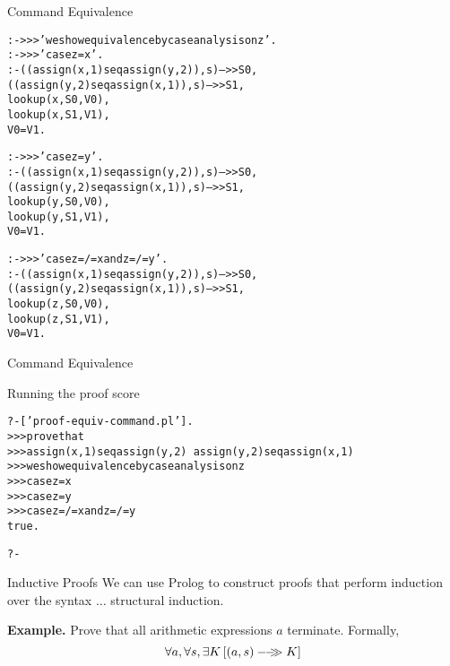 \documentclass{beamer}
\begin{document}
\begin{frame}[fragile]{Command Equivalence}
\scriptsize
\begin{alltt}
:- >>> 'we show equivalence by case analysis on z' .
:- >>> 'case z = x'.
:- ((assign(x,1) seq assign(y,2)),s)-->>S0,
   ((assign(y,2) seq assign(x,1)),s)-->>S1,
   lookup(x,S0,V0),
   lookup(x,S1,V1),
   V0=V1.

:- >>> 'case z = y'.
:- ((assign(x,1) seq assign(y,2)),s)-->>S0,
   ((assign(y,2) seq assign(x,1)),s)-->>S1,
   lookup(y,S0,V0),
   lookup(y,S1,V1),
   V0=V1.

:- >>> 'case z =/= x and z =/= y'.
:- ((assign(x,1) seq assign(y,2)),s)-->>S0,
   ((assign(y,2) seq assign(x,1)),s)-->>S1,
   lookup(z,S0,V0),
   lookup(z,S1,V1),
   V0=V1.

\end{alltt}
\end{frame}

\begin{frame}[fragile]{Command Equivalence}

Running the proof score
\scriptsize
\begin{alltt}
?- ['proof-equiv-command.pl'].
%   xis.pl compiled 0.01 sec, 6,920 bytes
%  preamble.pl compiled 0.01 sec, 8,108 bytes
>>> prove that
>>>    assign(x,1) seq assign(y,2) ~ assign(y,2) seq assign(x,1)
%    xis.pl compiled 0.00 sec, 136 bytes
%   preamble.pl compiled 0.00 sec, 264 bytes
%   xis.pl compiled 0.00 sec, 136 bytes
%  sem.pl compiled 0.00 sec, 5,960 bytes
>>> we show equivalence by case analysis on z
>>> case z = x
>>> case z = y
>>> case z =/= x and z =/= y
% proof-equiv-command.pl compiled 0.01 sec, 15,988 bytes
true.

?- 
\end{alltt}
\end{frame}



\begin{frame}[fragile]{Inductive Proofs}
We can use Prolog to construct proofs that 
perform induction over the syntax $\ldots$ structural induction.

\vspace{.1in}

{\bf Example.} Prove that all arithmetic expressions $a$ terminate.  Formally,
\[
\forall a,\forall s ,  \exists K \left[
{(a,s)}-\!\!-\!\!\!\!\gg{K}\right]
\]
\end{frame}
\end{document}
